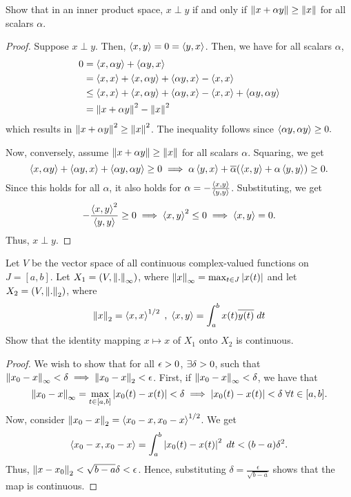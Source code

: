\begin{question}
    Show that in an inner product space, $x \perp y$ if and only if $\left\lVert x + \alpha y \right\rVert \geq \left\lVert x \right\rVert$ for all scalars $\alpha$.
    \label{section3.2-8}
\end{question}
\begin{proof}
    Suppose $x \perp y$. Then, $\left\langle x , y \right\rangle = 0 = \left\langle y , x \right\rangle$. Then, we have for all scalars $\alpha$,
    \begin{align*}
        0 &= \left\langle x , \alpha y \right\rangle + \left\langle \alpha y , x \right\rangle
        \\
        &= \left\langle x , x \right\rangle + \left\langle x , \alpha y \right\rangle + \left\langle \alpha y , x \right\rangle - \left\langle x , x \right\rangle
        \\
        &\leq \left\langle x , x \right\rangle + \left\langle x , \alpha y \right\rangle + \left\langle \alpha y , x \right\rangle - \left\langle x , x \right\rangle + \left\langle \alpha y , \alpha y \right\rangle
        \\
        &= \left\lVert x + \alpha y \right\rVert^2 - \left\lVert x \right\rVert^2
    \end{align*}
    which results in $\left\lVert x + \alpha y \right\rVert^2 \geq \left\lVert x \right\rVert^2$. The inequality follows since $\left\langle \alpha y , \alpha y \right\rangle \geq 0.$

    Now, conversely, assume $\left\lVert x + \alpha y \right\rVert \geq \left\lVert x \right\rVert$ for all scalars $\alpha$. Squaring, we get
    \[\left\langle x , \alpha y \right\rangle + \left\langle \alpha y , x \right\rangle + \left\langle \alpha y , \alpha y \right\rangle \geq 0 \implies \alpha \left\langle y , x \right\rangle + \overline{\alpha}(\left\langle x , y \right\rangle + \alpha \left\langle y , y \right\rangle) \geq 0.\]
    Since this holds for all $\alpha$, it also holds for $\alpha = -\frac{\left\langle x , y \right\rangle}{\left\langle y , y \right\rangle}$. Substituting, we get
    \[-\frac{\left\langle x , y \right\rangle^2}{\left\langle y , y \right\rangle} \geq 0 \implies \left\langle x , y \right\rangle^2 \leq 0 \implies \left\langle x , y \right\rangle = 0.\]
    Thus, $x \perp y$.
\end{proof}

\begin{question}
    Let $V$ be the vector space of all continuous complex-valued functions on $J = [a,b]$. Let $X_1 = (V , \left\lVert . \right\rVert_\infty)$, where $\left\lVert x \right\rVert_\infty = \max_{t \in J}\left\lvert x(t) \right\rvert$ and let $X_2 = (V , \left\lVert . \right\rVert_2)$, where
    \[\left\lVert x \right\rVert_2 = \left\langle x , x \right\rangle^{1/2} \;,\; \left\langle x , y \right\rangle = \int_{a}^b x(t) \overline{y(t)} \; dt\]
    Show that the identity mapping $x \mapsto x$ of $X_1$ onto $X_2$ is continuous.
    \label{section3.2-9}
\end{question}
\begin{proof}
    We wish to show that for all $\epsilon > 0$, $\exists \delta >0$, such that $\left\lVert x_0 - x \right\rVert_\infty < \delta \implies \left\lVert x_0 - x \right\rVert_2 < \epsilon$. First, if $\left\lVert x_0 - x \right\rVert_\infty < \delta$, we have that
    \[\left\lVert x_0 - x \right\rVert_\infty = \max_{t \in [a,b]} \left\lvert x_0(t) - x(t) \right\rvert < \delta \implies \left\lvert x_0(t) - x(t) \right\rvert < \delta \;\forall t \in[a,b].\]
    Now, consider $\left\lVert x_0 - x \right\rVert_2 = \left\langle x_0 - x , x_0 - x \right\rangle^{1/2}$. We get
    \[\left\langle x_0 - x , x_0 - x \right\rangle = \int_{a}^{b} \left\lvert x_0(t) - x(t) \right\rvert^2 \;dt < (b-a) \delta^2.\]
    Thus, $\left\lVert x - x_0 \right\rVert_2 < \sqrt{b-a} \delta < \epsilon$. Hence, substituting $\delta = \frac{\epsilon}{\sqrt{b-a}}$ shows that the map is continuous.
\end{proof}

